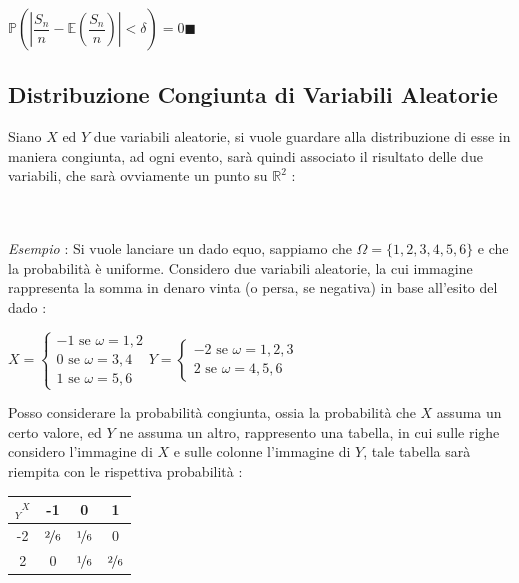 \documentclass[12pt, letterpaper]{article}
\newcommand{\R}{{\mathbb R}}
\newcommand{\E}{{\mathbb E}}
\newcommand{\acc}{\\\hphantom{}\\}
\newcommand{\Prob}{{\mathbb P}}
\begin{document}
\begin{center}
    \(\Prob(|\dfrac{S_n}{n}-\E(\dfrac{S_n}{n})|<\delta)=0\)\hphantom{aaaa}\(\blacksquare\)
\end{center}
\newpage\subsection{Distribuzione Congiunta di Variabili Aleatorie}
Siano \(X\) ed \(Y\) due variabili aleatorie, si vuole guardare alla distribuzione di esse in maniera 
congiunta, ad ogni evento, sarà quindi associato il risultato delle due variabili, che sarà ovviamente 
un punto su \(\R^2\) :
\begin{figure}[h]
\end{figure}\acc
\textit{Esempio }: Si vuole lanciare un dado equo, sappiamo che \(\Omega=\{1,2,3,4,5,6\}\) e che la 
probabilità è uniforme. Considero due variabili aleatorie, la cui immagine rappresenta la somma in 
denaro vinta (o persa, se negativa) in base all'esito del dado : \begin{center}
    \(
    X=\begin{cases}
        -1\text{ se }\omega =1,2\\ 
        0\text{ se }\omega =3,4\\ 
        1\text{ se }\omega =5,6
    \end{cases}    
    \)\hphantom{text}\( Y=\begin{cases}
        -2\text{ se }\omega =1,2,3\\ 
        2\text{ se }\omega =4,5,6
    \end{cases}    
    \)
\end{center}
Posso considerare la probabilità congiunta, ossia la probabilità che \(X\) assuma un certo valore, 
ed \(Y\) ne assuma un altro, rappresento una tabella, in cui sulle righe considero l'immagine di \(X\) 
e sulle colonne l'immagine di \(Y\), tale tabella sarà riempita con le rispettiva probabilità : \begin{center}
    \begin{tabular}{|c|c|c|c|}
        \hline
        \rowcolor[HTML]{FD6864} 
        \cellcolor[HTML]{C0C0C0}\(\text{}^{\text{ }X}_Y\) & -1  & 0   & 1   \\ \hline
        \cellcolor[HTML]{9698ED}-2 & \(\nicefrac{2}{6}\) & \(\nicefrac{1}{6}\) & 0   \\ \hline
        \cellcolor[HTML]{9698ED}2  & 0   & \(\nicefrac{1}{6}\) & \(\nicefrac{2}{6}\) \\ \hline
        \end{tabular}
\end{center}
\end{document}
